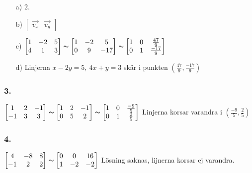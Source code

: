 \documentclass{article}
\begin{document}
\begin{itemize}
\item[a) ] 2.
\item[b) ] $\begin{bmatrix}\vec{v_x} & \vec{v_y}\end{bmatrix}$
\item[c) ] $\begin{bmatrix}1&-2&5\\4&1&3\end{bmatrix}\thicksim\begin{bmatrix}1&-2&5\\0&9&-17\end{bmatrix}\thicksim\begin{bmatrix}1&0&\frac{47}{9}\\0&1&\frac{-17}{9}\end{bmatrix}$
\item[d) ] Linjerna $x-2y=5,\ 4x+y=3$ skär i punkten $(\frac{47}{9},\frac{-17}{9} )$
\end{itemize}

\subsubsection*{3.}
$\begin{bmatrix}
1 &2 &-1 \\
-1 &3 & 3
\end{bmatrix}\thicksim
\begin{bmatrix}
1 & 2&-1 \\
0 &5 &2 
\end{bmatrix}\thicksim
\begin{bmatrix}
1 &0 &\frac{-9}{5} \\
0 &1 &\frac{2}{5} 
\end{bmatrix}
$ Linjerna korsar varandra i $(\frac{-9}{5},\frac{2}{5})$

\subsubsection*{4.}
$\begin{bmatrix}
4 &-8 &8 \\
-1 &2 &2 
\end{bmatrix}\thicksim
\begin{bmatrix}
0 &0 &16 \\
 1&-2 &-2 
\end{bmatrix}
$ Lösning saknas, lijnerna korsar ej varandra.
\end{document}
